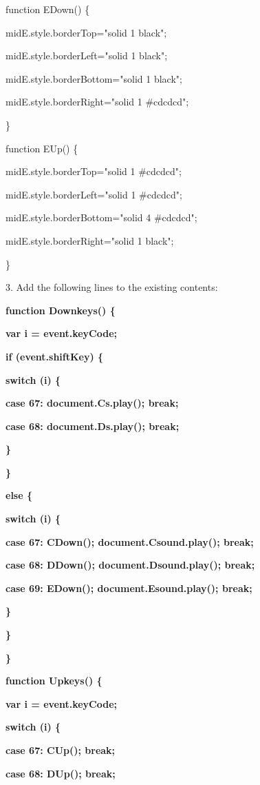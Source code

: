 \documentclass[
]{article}
\begin{document}
function EDown() \{

midE.style.borderTop="solid 1 black";

midE.style.borderLeft="solid 1 black";

midE.style.borderBottom="solid 1 black";

midE.style.borderRight="solid 1 \#cdcdcd";

\}

function EUp() \{

midE.style.borderTop="solid 1 \#cdcdcd";

midE.style.borderLeft="solid 1 \#cdcdcd";

midE.style.borderBottom="solid 4 \#cdcdcd";

midE.style.borderRight="solid 1 black";

\}

3. Add the following lines to the existing contents:

\textbf{function Downkeys() \{}

\textbf{var i = event.keyCode;}

\textbf{}

\textbf{if (event.shiftKey) \{}

\textbf{switch (i) \{}

\textbf{case 67: document.Cs.play(); break;}

\textbf{case 68: document.Ds.play(); break;}

\textbf{\}}

\textbf{\}}

\textbf{}

\textbf{else \{}

\textbf{switch (i) \{}

\textbf{case 67: CDown(); document.Csound.play(); break;}

\textbf{case 68: DDown(); document.Dsound.play(); break;}

\textbf{case 69: EDown(); document.Esound.play(); break;}

\textbf{\}}

\textbf{\}}

\textbf{\}}

\textbf{}

\textbf{function Upkeys() \{}

\textbf{var i = event.keyCode;}

\textbf{switch (i) \{}

\textbf{case 67: CUp(); break;}

\textbf{case 68: DUp(); break;}
\end{document}
